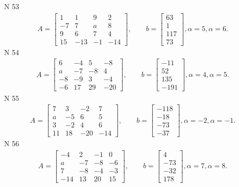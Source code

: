 \documentclass[11pt]{report}
\begin{document}
N 53
\begin{align*}
 A = \left[\begin{matrix}1 & 1 & 9 & 2\\-7 & 7 & a & 8\\9 & 6 & 7 & 4\\15 & -13 & -1 & -14\end{matrix}\right],
    \qquad b = \left[\begin{matrix}63\\1\\117\\73\end{matrix}\right], \alpha = 5, \alpha = 6. 
 \end{align*}
N 54
\begin{align*}
 A = \left[\begin{matrix}6 & -4 & 5 & -8\\a & -7 & -8 & 4\\-8 & -9 & 3 & -4\\-6 & 17 & 29 & -20\end{matrix}\right],
    \qquad b = \left[\begin{matrix}-11\\52\\135\\-191\end{matrix}\right], \alpha = 4, \alpha = 5. 
 \end{align*}
N 55
\begin{align*}
 A = \left[\begin{matrix}7 & 3 & -2 & 7\\a & -5 & 6 & 5\\3 & -2 & 4 & 6\\11 & 18 & -20 & -14\end{matrix}\right],
    \qquad b = \left[\begin{matrix}-118\\-18\\-73\\-37\end{matrix}\right], \alpha = -2, \alpha = -1. 
 \end{align*}
N 56
\begin{align*}
 A = \left[\begin{matrix}-4 & 2 & -1 & 0\\a & -7 & -8 & -6\\7 & -8 & -4 & -3\\-14 & 13 & 20 & 15\end{matrix}\right],
    \qquad b = \left[\begin{matrix}4\\-73\\-32\\178\end{matrix}\right], \alpha = 7, \alpha = 8. 
 \end{align*}
\end{document}

